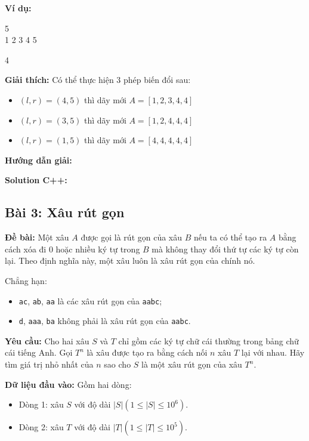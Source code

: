 \documentclass[12pt]{scrartcl}  %
\begin{document}
\textbf{Ví dụ:}
\begin{tcolorbox}[colback=gray!5!white, colframe=blue!50!black, title=Input]
5\\
1 2 3 4 5
\end{tcolorbox}
\begin{tcolorbox}[colback=gray!5!white, colframe=green!50!black, title=Output]
4
\end{tcolorbox}

\textbf{Giải thích:}
Có thể thực hiện $3$ phép biến đổi sau:
\begin{itemize}
    \item $(l, r) = (4, 5)$ thì dãy mới $A = \left[1, 2, 3, 4, 4 \right]$
    \item $(l, r) = (3, 5)$ thì dãy mới $A = \left[1, 2, 4, 4, 4 \right]$
    \item $(l, r) = (1, 5)$ thì dãy mới $A = \left[4, 4, 4, 4, 4 \right]$
\end{itemize}

\textbf{Hướng dẫn giải:}

\textbf{Solution C++:}

\subsection{Bài 3: Xâu rút gọn}
\textbf{Đề bài:}
Một xâu $A$ được gọi là rút gọn của xâu $B$ nếu ta có thể tạo ra $A$ bằng cách xóa đi $0$ hoặc nhiều ký tự 
trong $B$ mà không thay đổi thứ tự các ký tự còn lại. Theo định nghĩa này, một xâu luôn là xâu rút gọn của chính nó.

Chẳng hạn:
\begin{itemize}
    \item \texttt{ac}, \texttt{ab}, \texttt{aa} là các xâu rút gọn của \texttt{aabc};
    \item \texttt{d}, \texttt{aaa}, \texttt{ba} không phải là xâu rút gọn của \texttt{aabc}.
\end{itemize}

\textbf{Yêu cầu:}
Cho hai xâu $S$ và $T$ chỉ gồm các ký tự chữ cái thường trong bảng chữ cái tiếng Anh. Gọi $T^n$ là xâu được tạo ra bằng cách nối $n$ xâu $T$ lại với nhau. 
Hãy tìm giá trị nhỏ nhất của $n$ sao cho $S$ là một xâu rút gọn của xâu $T^n$. 

\textbf{Dữ liệu đầu vào:}
Gồm hai dòng:
\begin{itemize}
    \item Dòng 1: xâu $S$ với độ dài $|S| (1 \leq |S| \leq 10^6)$.
    \item Dòng 2: xâu $T$ với độ dài $|T| (1 \leq |T| \leq 10^5)$.
\end{itemize}
\end{document}

